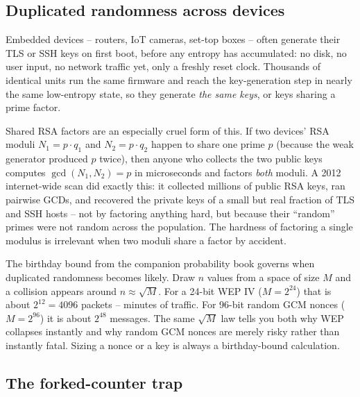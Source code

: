 \subsection{Duplicated randomness across devices}
\label{ch38:duplicated-random}

Embedded devices -- routers, IoT cameras, set-top boxes -- often generate their TLS or SSH keys on first boot, before any entropy has accumulated: no disk, no user input, no network traffic yet, only a freshly reset clock. Thousands of identical units run the same firmware and reach the key-generation step in nearly the same low-entropy state, so they generate \emph{the same keys}, or keys sharing a prime factor.

\begin{whybox}
Shared RSA factors are an especially cruel form of this. If two devices' RSA moduli $N_1 = p\cdot q_1$ and $N_2 = p \cdot q_2$ happen to share one prime $p$ (because the weak generator produced $p$ twice), then anyone who collects the two public keys computes $\gcd(N_1, N_2) = p$ in microseconds and factors \emph{both} moduli. A 2012 internet-wide scan did exactly this: it collected millions of public RSA keys, ran pairwise GCDs, and recovered the private keys of a small but real fraction of TLS and SSH hosts -- not by factoring anything hard, but because their ``random'' primes were not random across the population. The hardness of factoring a single modulus is irrelevant when two moduli share a factor by accident.
\end{whybox}

\begin{connectionbox}
The birthday bound from the companion probability book governs when duplicated randomness becomes likely. Draw $n$ values from a space of size $M$ and a collision appears around $n \approx \sqrt{M}$. For a 24-bit WEP IV ($M = 2^{24}$) that is about $2^{12} = 4096$ packets -- minutes of traffic. For 96-bit random GCM nonces ($M = 2^{96}$) it is about $2^{48}$ messages. The same $\sqrt{M}$ law tells you both why WEP collapses instantly and why random GCM nonces are merely risky rather than instantly fatal. Sizing a nonce or a key is always a birthday-bound calculation.
\end{connectionbox}

\subsection{The forked-counter trap}
\label{ch38:fork-trap}

